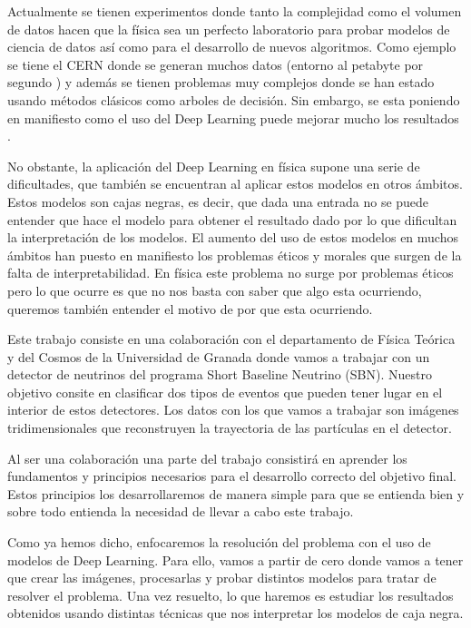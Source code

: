 \documentclass[a4paper,12pt,twoside,titlepage]{article}
\begin{document}
Actualmente se tienen experimentos donde tanto la complejidad como el volumen de datos hacen que la física sea un perfecto laboratorio para probar modelos de ciencia de datos así como para el desarrollo de nuevos algoritmos. Como ejemplo se tiene el CERN donde se generan muchos datos (entorno al petabyte por segundo \cite{ml_phy}) y además se tienen problemas muy complejos donde se han estado usando métodos clásicos como arboles de decisión. Sin embargo, se esta poniendo en manifiesto como el uso del Deep Learning puede mejorar mucho los resultados \cite{ml_phy}.

No obstante, la aplicación del Deep Learning en física supone una serie de dificultades, que también se encuentran al aplicar estos modelos en otros ámbitos. Estos modelos son cajas negras, es decir, que dada una entrada no se puede entender que hace el modelo para obtener el resultado dado por lo que dificultan la interpretación de los modelos. El aumento del uso de estos modelos en muchos ámbitos han puesto en manifiesto los problemas éticos y morales que surgen de la falta de interpretabilidad. En física este problema no surge por problemas éticos pero lo que ocurre es que no nos basta con saber que algo esta ocurriendo, queremos también entender el motivo de por que esta ocurriendo.

Este trabajo consiste en una colaboración con el departamento de Física Teórica y del Cosmos de la Universidad de Granada donde vamos a trabajar con un detector de neutrinos del programa Short Baseline Neutrino (SBN). Nuestro objetivo consite en clasificar dos tipos de eventos que pueden tener lugar en el interior de estos detectores. Los datos con los que vamos a trabajar son imágenes tridimensionales que reconstruyen la trayectoria de las partículas en el detector.     

Al ser una colaboración una parte del trabajo consistirá en aprender los fundamentos y principios necesarios para el desarrollo correcto del objetivo final. Estos principios los desarrollaremos de manera simple para que se entienda bien y sobre todo entienda la necesidad de llevar a cabo este trabajo.

Como ya hemos dicho, enfocaremos la resolución del problema con el uso de modelos de Deep Learning. Para ello, vamos a partir de cero donde vamos a tener que crear las imágenes, procesarlas y probar distintos modelos para tratar de resolver el problema. Una vez resuelto, lo que haremos es estudiar los resultados obtenidos usando distintas técnicas que nos interpretar los modelos de caja negra.
\end{document}
